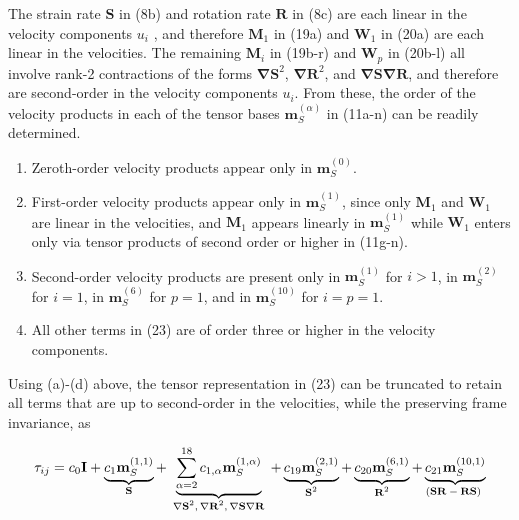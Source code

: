 The strain rate $\mathbf{S}$ in (8b) and rotation rate $\mathbf{R}$ in (8c) are each linear in the velocity components $u_i$ , and therefore  $\mathbf{M}_1$ in (19a) and $\mathbf{W}_1$  in (20a) are each linear in the velocities.  The remaining $\mathbf{M}_i$  in (19b-r) and  $\mathbf{W}_p$ in (20b-l) all involve rank-2 contractions of the forms $\mathbf{\nabla S}^2$, $\mathbf{\nabla R}^2$, and $\mathbf{\nabla S \nabla R}$, and therefore are second-order in the velocity components $u_i$.  From these, the order of the velocity products in each of the tensor bases $\mathbf{m}^{(\alpha)}_{S}$  in (11a-n) can be readily determined.  

%
\begin{enumerate}[label=\emph({\alph*})]
%	
	\item	Zeroth-order velocity products appear only in $\mathbf{m}^{(0)}_{S}$.  
%	
	\item   First-order velocity products appear only in $\mathbf{m}^{(1)}_{S}$, since only   $\mathbf{M}_{1}$  and $\mathbf{W}_{1}$ are linear in the velocities, and $\mathbf{M}_{1}$   appears linearly in  $\mathbf{m}^{(1)}_{S}$ while  $\mathbf{W}_{1}$ enters only via tensor products of second order or higher in (11g-n).  
%	
	\item   Second-order velocity products are present only in $\mathbf{m}^{(1)}_{S}$ for $i > 1$, in $\mathbf{m}^{(2)}_{S}$  for $i=1$, in  $\mathbf{m}^{(6)}_{S}$ for $p=1$, and in $\mathbf{m}^{(10)}_{S}$  for $i = p = 1$.
%	
	\item   All other terms in (23) are of order three or higher in the velocity components.
%
\end{enumerate}
%
%   

Using (a)-(d) above, the tensor representation in (23) can be truncated to retain all terms that are up to second-order in the velocities, while the preserving frame invariance, as

%
\begin{equation}
	\label{E:41}
	\mathbf{\tau}_{ij} =  c_{0} \mathbf{I}
	+ \underbrace{
				c_{1} \mathbf{m}^{(1,1)}_{S}
				} %
				_{\text{\textbf{S}}}
	+ \underbrace{
				\sum_{\alpha=2}^{18} c_{1,\alpha} \mathbf{m}^{(1,\alpha)}_{S}
				 } %
				_{\text{ $ \mathbf{\nabla S}^{2}, \mathbf{\nabla R}^{2}, \mathbf{\nabla S \nabla R}$ }}
	+ \underbrace{
				c_{19} \mathbf{m}^{(2,1)}_{S}
				}%
				_{\text{ $\mathbf{S}^2$ }}
	+ \underbrace{
				c_{20} \mathbf{m}^{(6,1)}_{S}
				}%
				_{\text{ $\mathbf{R}^2$ }}
	+ \underbrace{
				c_{21} \mathbf{m}^{(10,1)}_{S}
				}%
				_{\text{$(\mathbf{SR-RS})$ }}
\end{equation}
%
%   

